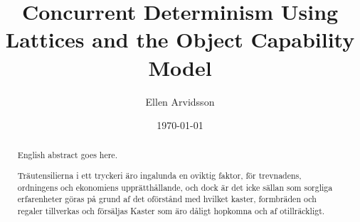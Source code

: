 \documentclass{kththesis}
\title{Concurrent Determinism Using Lattices and the Object Capability Model}
\author{Ellen Arvidsson}
\date{\today}
\begin{document}
\frontmatter

\titlepage

\begin{abstract}
  English abstract goes here.

\end{abstract}


\begin{otherlanguage}{swedish}
  \begin{abstract}
    Träutensilierna i ett tryckeri äro ingalunda en oviktig faktor,
    för trevnadens, ordningens och ekonomiens upprätthållande, och
    dock är det icke sällan som sorgliga erfarenheter göras på grund
    af det oförstånd med hvilket kaster, formbräden och regaler
    tillverkas och försäljas Kaster som äro dåligt hopkomna och af
    otillräckligt.
  \end{abstract}
\end{otherlanguage}


\tableofcontents


\mainmatter

















\printbibliography[heading=bibintoc] %

\appendix




\end{document}
